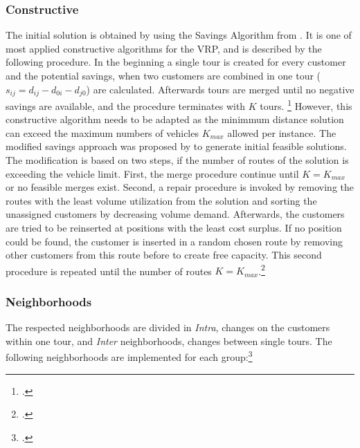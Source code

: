\subsubsection{Constructive}
The initial solution is obtained by using the Savings Algorithm from \cite{clarke_scheduling_1964}. It is one of
most applied constructive algorithms for the \gls{VRP}, and is described by the following procedure. In the beginning
a single tour is created for every customer and the potential savings, when two customers are combined in one tour
($s_{ij} = d_{ij} - d_{0i} - d_{j0}$) are calculated.
Afterwards tours are merged until no negative savings are available, and the
procedure terminates with $K$ tours. \footcite[cf.][]{clarke_scheduling_1964} However, this constructive algorithm needs to be adapted
as the minimmum distance solution can exceed the maximum numbers of vehicles $K_{max}$ allowed per instance.
The modified savings approach was proposed by \cite{zhang_evolutionary_2015} to generate initial feasible solutions.
The modification is based on two steps, if the number of routes of the solution is exceeding the vehicle limit. First,
the merge procedure continue until $K = K_{max}$ or no feasible merges exist. Second, a repair procedure is invoked
by removing the routes with the least volume utilization from the solution and sorting the unassigned customers by
decreasing volume demand. Afterwards, the customers are tried to be reinserted at positions with the least
cost surplus. If no position could be found, the customer is inserted in a random chosen route by removing
other customers from this route before to create free capacity. This second procedure is repeated until the
number of routes $K = K_{max}$.\footcite[cf.][p.24]{zhang_evolutionary_2015}

\subsubsection{Neighborhoods}
\label{sec:neighborhoods}

The respected neighborhoods are divided in \textit{Intra}, changes on the customers within one tour, and \textit{Inter} neighborhoods,
changes between single tours. The following neighborhoods are implemented for each group:\footcite[cf.][pp. 89-90]{toth_vehicle_2014}

